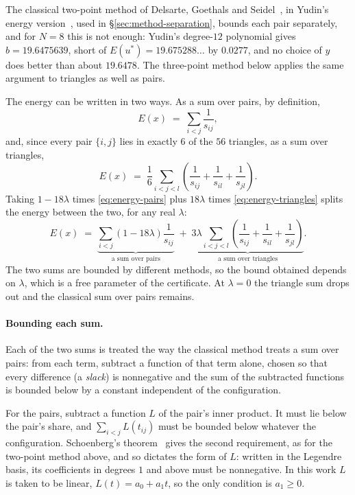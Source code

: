 \documentclass[11pt]{article}
\theoremstyle{definition}
\theoremstyle{remark}
\newcommand{\energy}{E}
\begin{document}
The classical two-point method of Delsarte, Goethals and
Seidel~\cite{DGS77}, in Yudin's energy version~\cite{Yud92}, used in
\S\ref{sec:method-separation}, bounds each pair separately, and for
$N=8$ this is not enough: Yudin's degree-$12$ polynomial gives
$b=19.6475639$, short of $\energy(u^*)=19.675288\ldots$ by $0.0277$, and
no choice of $y$ does better than about $19.6478$.
The three-point method below applies the same argument to triangles as
well as pairs.

The energy can be written in two ways. As a sum over pairs, by
definition,
\begin{equation}
  \label{eq:energy-pairs}
  \energy(x) \;=\; \sum_{i<j} \frac{1}{s_{ij}},
\end{equation}
and, since every pair $\{i,j\}$ lies in exactly $6$ of the $56$
triangles, as a sum over triangles,
\begin{equation}
  \label{eq:energy-triangles}
  \energy(x) \;=\; \frac16\sum_{i<j<l}\left(\frac1{s_{ij}}+\frac1{s_{il}}+\frac1{s_{jl}}\right).
\end{equation}
Taking $1-18\lambda$ times \eqref{eq:energy-pairs} plus $18\lambda$
times \eqref{eq:energy-triangles} splits the energy between the two,
for any real $\lambda$:
\begin{equation}
  \label{eq:lambda-split}
  \energy(x) \;=\; \underbrace{\sum_{i<j} (1-18\lambda)\frac{1}{s_{ij}}}_{\text{a sum over pairs}}
  \;+\; \underbrace{3\lambda \sum_{i<j<l}\left(\frac1{s_{ij}}+\frac1{s_{il}}+\frac1{s_{jl}}\right)}_{\text{a sum over triangles}}.
\end{equation}
The two sums are bounded by different methods, so the bound obtained
depends on $\lambda$, which is a free parameter of the certificate. At $\lambda=0$ the triangle sum
drops out and the classical sum over pairs remains.

\paragraph{Bounding each sum.} Each of the two sums is treated the way
the classical method treats a sum over pairs: from each term, subtract a
function of that term alone, chosen so that every difference (a
\emph{slack}) is nonnegative and the sum of the subtracted functions is
bounded below by a constant independent of the configuration.

For the pairs, subtract a function $L$ of the pair's inner product. It
must lie below the pair's share, and $\sum_{i<j}L(t_{ij})$ must be
bounded below whatever the configuration. Schoenberg's
theorem~\cite{Sch42} gives
the second requirement, as for the two-point method above, and
so dictates the form of $L$: written in the Legendre basis, its
coefficients in degrees $1$ and above must be nonnegative. In this work
$L$ is taken to be linear, $L(t)=a_0+a_1t$, so the only condition is
$a_1\ge0$.
\end{document}
